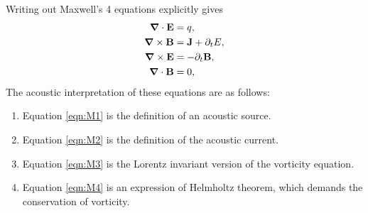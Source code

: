 \documentclass[10pt, fleqn,draft,showtrims,oldfontcommands]{article} %
\newcommand{\sub}[1]{\begin{subequations}#1\end{subequations}}
\newcommand{\eqa}[1]{\begin{align}#1\end{align}}
\newcommand{\eqal}[2]{\begin{align}#1\label{eqn:#2}\end{align}}
\newcommand{\eqnref}[1]{\ref{eqn:#1}}
\newcommand{\lr}[1]{\left( #1 \right)}
\renewcommand{\d}{\partial}
\newcommand{\del}{\nabla}
\newcommand{\vdel}{ \mbox{\boldmath $\del$}}
\newcommand{\dt}{{\d_t}}
\newcommand{\vJ}{\vect J}
\newcommand{\vE}{\vect E}
\newcommand{\vB}{\vect B}
\newcommand{\g}{\gamma_0}
\newcommand{\vect}[1]{\mathbf{#1}}
\newcommand{\vA}{\textbf{A}}
\newcommand{\vv}{\textbf{v}}
\newcommand{\nlist}[1]
	   {  
	     \begin{enumerate}
	       #1
	     \end{enumerate} 
	   }
\begin{document}
Writing out Maxwell's 4 equations explicitly gives
\sub{
\eqa{
 \vdel \cdot \vE &= q,\label{eqn:M1}  \\ 
 \vdel \times \vB &= \vJ + \dt E, \label{eqn:M2}\\
 \vdel \times \vE &= -\dt\vB\label{eqn:M3},\\
 \vdel \cdot \vB &= 0\label{eqn:M4},
}
}
The acoustic interpretation of these equations are as follows:
\nlist{
\item Equation \eqnref{M1} is the definition of an acoustic source.
\item Equation \eqnref{M2} is the definition of the acoustic current.
\item Equation \eqnref{M3} is the Lorentz invariant version of the vorticity equation.
\item Equation \eqnref{M4} is an expression of Helmholtz theorem, which demands the conservation of vorticity.
}







\end{document}
